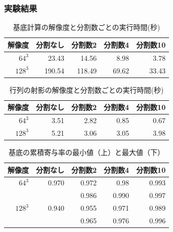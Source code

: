 \documentclass[aspectratio=169,dvipdfmx,hyperref={bookmarks=true}]{beamer}
\begin{document}
 \begin{frame}
 \frametitle{実験結果}
 \vspace{-25pt}
 \begin {table}[htbp]
    \centering
  \caption{基底計算の解像度と分割数ごとの実行時間(秒)}
  \label{tab:basis}
  \begin {tabular}{rrrrr} \hline
    \multicolumn{1}{c}{解像度} 					&\multicolumn{1}{c}{分割なし} 		&\multicolumn{1}{c}{分割数2}			&\multicolumn{1}{c}{分割数4} 		&\multicolumn{1}{c}{分割数10}\\ \hline
    $64^3$ 					& 23.43 			&14.56	 		&8.98	 	&3.78\\
    $128^3$ 				& 190.54 			&118.49 			& 69.62 		&33.43\\ \hline
  \end {tabular}
\end {table}

\begin {table}[htbp]
    \centering
  \caption{行列の射影の解像度と分割数ごとの実行時間(秒)}
  \label{tab:projection}
  \begin {tabular}{rrrrr} \hline
    \multicolumn{1}{c}{解像度} 					&\multicolumn{1}{c}{分割なし} 		&\multicolumn{1}{c}{分割数2}			&\multicolumn{1}{c}{分割数4} 		&\multicolumn{1}{c}{分割数10}\\ \hline
    $64^3$ 					& 3.51 			&2.82	 		&0.85	 		&0.67\\
    $128^3$ 				& 5.21 			& 3.06 			& 3.05 			&3.98\\ \hline
  \end {tabular}
\end {table}

\begin {table}[htbp]
    \centering
  \caption{基底の累積寄与率の最小値（上）と最大値（下）}
  \label{tab:ruiseki}
  \begin {tabular}{rrrrr} \hline
    \multicolumn{1}{c}{解像度} 					&\multicolumn{1}{c}{分割なし} 		&\multicolumn{1}{c}{分割数2}			&\multicolumn{1}{c}{分割数4} 		&\multicolumn{1}{c}{分割数10}\\ \hline
    $64^3$ 									& 0.970						& 0.972							&0.98		 				&0.993				\\
    										&							&0.986							&0.990						&0.997				\\ \hline
    $128^3$ 								&0.940 						&0.955							&0.971		 				&0.989				\\ 
    										&							&0.965							&0.976						&0.996				\\	\hline
  \end {tabular}
\end {table}
\end{frame}
\end{document}
